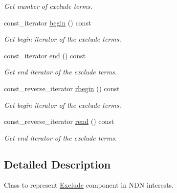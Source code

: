 \begin{DoxyCompactItemize}
\begin{DoxyCompactList}\small\item\em Get number of exclude terms. \end{DoxyCompactList}\item 
const\+\_\+iterator \hyperlink{classndn_1_1Exclude_a8e594601f5c4b6e1ffef2bccdad19efd}{begin} () const\hypertarget{classndn_1_1Exclude_a8e594601f5c4b6e1ffef2bccdad19efd}{}\label{classndn_1_1Exclude_a8e594601f5c4b6e1ffef2bccdad19efd}

\begin{DoxyCompactList}\small\item\em Get begin iterator of the exclude terms. \end{DoxyCompactList}\item 
const\+\_\+iterator \hyperlink{classndn_1_1Exclude_a5206a6bd0b6eb5a4684f1686e4e7f94b}{end} () const\hypertarget{classndn_1_1Exclude_a5206a6bd0b6eb5a4684f1686e4e7f94b}{}\label{classndn_1_1Exclude_a5206a6bd0b6eb5a4684f1686e4e7f94b}

\begin{DoxyCompactList}\small\item\em Get end iterator of the exclude terms. \end{DoxyCompactList}\item 
const\+\_\+reverse\+\_\+iterator \hyperlink{classndn_1_1Exclude_a5b960519b742bdd53ec696229bcf6063}{rbegin} () const\hypertarget{classndn_1_1Exclude_a5b960519b742bdd53ec696229bcf6063}{}\label{classndn_1_1Exclude_a5b960519b742bdd53ec696229bcf6063}

\begin{DoxyCompactList}\small\item\em Get begin iterator of the exclude terms. \end{DoxyCompactList}\item 
const\+\_\+reverse\+\_\+iterator \hyperlink{classndn_1_1Exclude_a9a46016ec47520e9d73e6c052873031b}{rend} () const\hypertarget{classndn_1_1Exclude_a9a46016ec47520e9d73e6c052873031b}{}\label{classndn_1_1Exclude_a9a46016ec47520e9d73e6c052873031b}

\begin{DoxyCompactList}\small\item\em Get end iterator of the exclude terms. \end{DoxyCompactList}\end{DoxyCompactItemize}


\subsection{Detailed Description}
Class to represent \hyperlink{classndn_1_1Exclude}{Exclude} component in N\+DN interests. 

